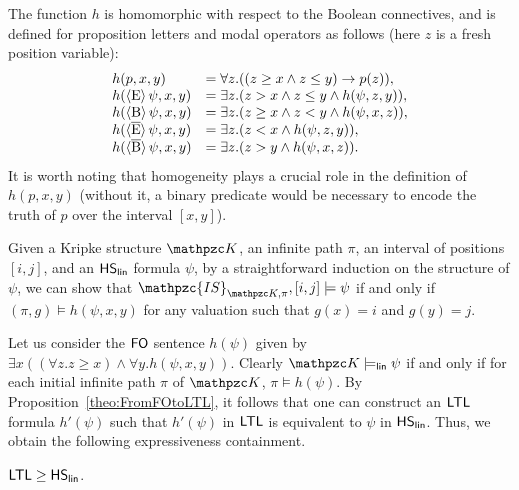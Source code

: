  The function $h$ is homomorphic with respect to the Boolean connectives, and is defined for proposition letters and modal operators as follows (here $z$ is a fresh position variable):
\[ \begin{array}{ll}
h(p,x,y) & = \forall z.((z\geq x \wedge z\leq y) \rightarrow p(z)),\\
h(\operatorname{\langle E\rangle}\psi,x,y) & = \exists z.(z> x \wedge z\leq y \wedge h(\psi,z,y)),\\
h(\operatorname{\langle B\rangle}\psi,x,y) & = \exists z.(z\geq x  \wedge z< y \wedge h(\psi,x,z)),\\
h(\operatorname{\langle \overline{E}\rangle}\psi,x,y) & = \exists z.(z< x \wedge h(\psi,z,y)),\\
h(\operatorname{\langle \overline{B}\rangle}\psi,x,y) & = \exists z.(z> y  \wedge  h(\psi,x,z)).
\end{array} \]
It is worth noting that homogeneity plays a crucial role in the definition of $h(p,x,y)$ (without it, a binary predicate would be necessary to encode the truth of $p$ over the interval $[x,y]$).

Given a Kripke structure $\Ku$, an infinite path $\pi$, an interval of positions $[i,j]$, and an $\text{\sffamily HS}_{\mathsf{lin}}$ formula $\psi$, by a straightforward induction on the structure of
$\psi$, we can show that 
$\mathpzc{IS}_{\Ku,\pi},[i,j]\models \psi$
if and only if $(\pi,g)\models h(\psi,x,y)$ for any valuation such that $g(x)= i$ and $g(y)=j$. 

Let us consider the
$\text{\sffamily FO}$ sentence $h(\psi)$ given by $\exists x ((\forall z.  z\geq x)\wedge \forall y.  h(\psi,x,y))$. Clearly $\Ku\models_\LinearTime \psi$ if and only if for each initial infinite path $\pi$ of $\Ku$, $\pi\models h(\psi)$.  By Proposition~\ref{theo:FromFOtoLTL}, it follows that one can construct an $\text{\sffamily LTL}$ formula $h'(\psi)$ such that $h'(\psi)$ in $\text{\sffamily LTL}$ is equivalent to $\psi$ in $\text{\sffamily HS}_{\mathsf{lin}}$. 
Thus, we obtain the following expressiveness containment.
 
\begin{theorem}\label{theo:HSTracedBasedIsINLTL} $\text{\sffamily LTL}\geq \text{\sffamily HS}_{\mathsf{lin}}$.
\end{theorem}





